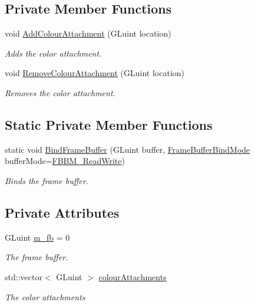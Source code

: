 \subsection*{Private Member Functions}
\begin{DoxyCompactItemize}
\item 
void \hyperlink{class_frame_buffer_a50bb0c3a712557569a60f737507aa1f0}{Add\+Colour\+Attachment} (G\+Luint location)
\begin{DoxyCompactList}\small\item\em Adds the color attachment. \end{DoxyCompactList}\item 
void \hyperlink{class_frame_buffer_a15c66284b8e592948c5d07f35344d111}{Remove\+Colour\+Attachment} (G\+Luint location)
\begin{DoxyCompactList}\small\item\em Removes the color attachment. \end{DoxyCompactList}\end{DoxyCompactItemize}
\subsection*{Static Private Member Functions}
\begin{DoxyCompactItemize}
\item 
static void \hyperlink{class_frame_buffer_a1d18b6f3d0b47bded6182509edbae223}{Bind\+Frame\+Buffer} (G\+Luint buffer, \hyperlink{_frame_buffer_8h_a3318e72469ce5bc8393bd02d39bc3742}{Frame\+Buffer\+Bind\+Mode} buffer\+Mode=\hyperlink{_frame_buffer_8h_a3318e72469ce5bc8393bd02d39bc3742ae77f3997d632fbdbe50556a908b53be1}{F\+B\+B\+M\+\_\+\+Read\+Write})
\begin{DoxyCompactList}\small\item\em Binds the frame buffer. \end{DoxyCompactList}\end{DoxyCompactItemize}
\subsection*{Private Attributes}
\begin{DoxyCompactItemize}
\item 
G\+Luint \hyperlink{class_frame_buffer_a4140264eca6a28a671947acb116df1ca}{m\+\_\+fb} = 0
\begin{DoxyCompactList}\small\item\em The frame buffer. \end{DoxyCompactList}\item 
std\+::vector$<$ G\+Luint $>$ \hyperlink{class_frame_buffer_af350664cd46e6ff4697e6d3b26478be6}{colour\+Attachments}
\begin{DoxyCompactList}\small\item\em The color attachments \end{DoxyCompactList}\end{DoxyCompactItemize}
